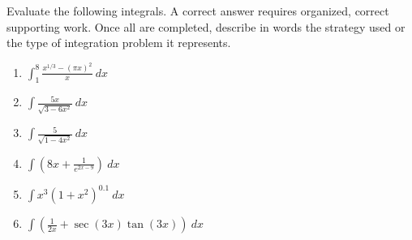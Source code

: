 \documentclass[11pt,fleqn]{article}
\begin{document}
\vspace*{-0.7in}

\begin{center}
  \Large{}
  \end{center}
  

Evaluate the following integrals. A correct answer requires organized, correct supporting work. Once all are completed, describe in words the strategy used or the type of integration problem it represents.
\begin{enumerate}
\item $\displaystyle \int_1^8 \frac{x^{1/3} -(\pi x)^2}{x}\: dx$

\vfill

\item $\displaystyle \int \frac{5x}{\sqrt{3-6x^2}} \: dx$

\vfill

\item $\displaystyle \int\frac{5}{\sqrt{1-4x^2}} \: dx$

\vfill

\newpage

\item $\displaystyle \int \left(8x+\frac{1}{e^{2x-9}} \right) \: dx$

\vfill

\item $\displaystyle \int x^3(1+x^2)^{0.1}\: dx$

\vfill

\item $\displaystyle \int \left( \frac{1}{2x}+ \sec(3x)\tan(3x) \right)\: dx$

\vfill

\end{enumerate}
\end{document}
